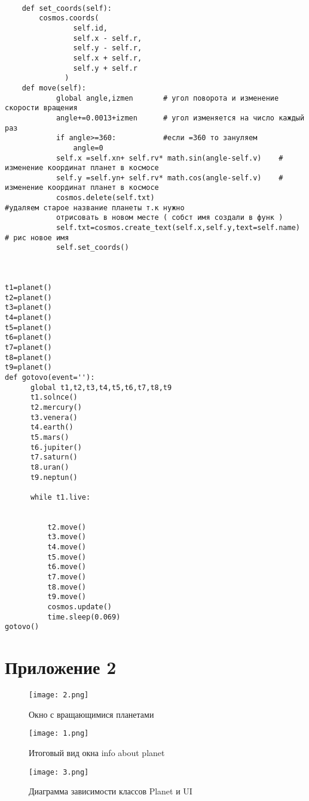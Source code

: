 \documentclass[11pt,a4paper]{report}
\begin{document}
\begin{verbatim}
      
    def set_coords(self):
        cosmos.coords(
                self.id,
                self.x - self.r,
                self.y - self.r,
                self.x + self.r,
                self.y + self.r
              )
    def move(self):
            global angle,izmen       # угол поворота и изменение скорости вращения 
            angle+=0.0013+izmen      # угол изменяется на число каждый раз
            if angle>=360:           #если =360 то зануляем
                angle=0
            self.x =self.xn+ self.rv* math.sin(angle-self.v)    # изменение координат планет в космосе 
            self.y =self.yn+ self.rv* math.cos(angle-self.v)    # изменение координат планет в космосе
            cosmos.delete(self.txt)                             #удаляем старое название планеты т.к нужно 
            отрисовать в новом месте ( собст имя создали в функ )
            self.txt=cosmos.create_text(self.x,self.y,text=self.name) # рис новое имя 
            self.set_coords()   
  
             
    
t1=planet()
t2=planet()
t3=planet()
t4=planet()
t5=planet()
t6=planet()
t7=planet()
t8=planet()
t9=planet()
def gotovo(event=''):
      global t1,t2,t3,t4,t5,t6,t7,t8,t9
      t1.solnce()
      t2.mercury()
      t3.venera()
      t4.earth()
      t5.mars()
      t6.jupiter()
      t7.saturn()
      t8.uran()
      t9.neptun()
      
      while t1.live:
        
        
          t2.move()          
          t3.move()
          t4.move()
          t5.move()
          t6.move()
          t7.move()
          t8.move()
          t9.move()
          cosmos.update()
          time.sleep(0.069)
gotovo()
\end{verbatim}
\normalsize
\newpage
\section{Приложение 2}

\begin{figure}[h]
\centering
\texttt{[image: 2.png]}
\caption{Окно с вращающимися планетами}
\label{fig:mpr}
\end{figure}

\begin{figure}[h]
\centering
\texttt{[image: 1.png]}
\caption{Итоговый вид окна info about planet}
\label{fig:mpr}

\end{figure}
\begin{figure}[h]
\centering
\texttt{[image: 3.png]}
\caption{Диаграмма зависимости классов Planet и UI}
\label{fig:mpr}
\end{figure}
\end{document}
